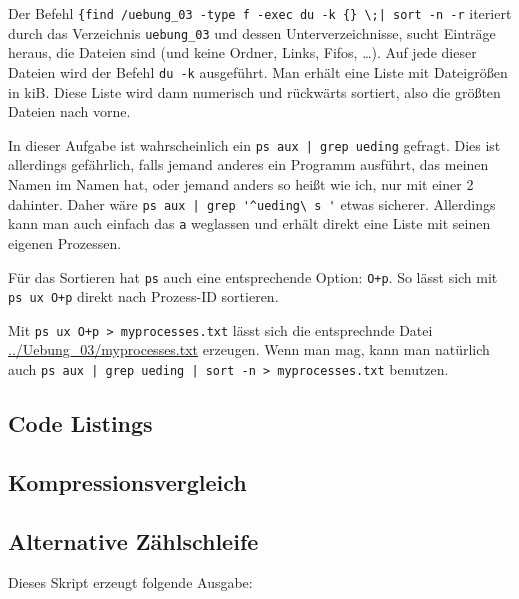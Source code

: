 \documentclass[10pt]{article}
\begin{document}
Der Befehl \verb#{find /uebung_03 -type f -exec du -k {} \;| sort -n -r# iteriert durch das Verzeichnis \verb#uebung_03# und dessen Unterverzeichnisse, sucht Einträge heraus, die Dateien sind (und keine Ordner, Links, Fifos, …). Auf jede dieser Dateien wird der Befehl \texttt{du -k} ausgeführt. Man erhält eine Liste mit Dateigrößen in kiB. Diese Liste wird dann numerisch und rückwärts sortiert, also die größten Dateien nach vorne.


In dieser Aufgabe ist wahrscheinlich ein \verb#ps aux | grep ueding# gefragt. Dies ist allerdings gefährlich, falls jemand anderes ein Programm ausführt, das meinen Namen im Namen hat, oder jemand anders so heißt wie ich, nur mit einer 2 dahinter. Daher wäre \verb#ps aux | grep '^ueding\ s '# etwas sicherer. Allerdings kann man auch einfach das \texttt{a} weglassen und erhält direkt eine Liste mit seinen eigenen Prozessen.

Für das Sortieren hat \texttt{ps} auch eine entsprechende Option: \texttt{O+p}. So lässt sich mit \texttt{ps ux O+p} direkt nach Prozess-ID sortieren.

Mit \verb#ps ux O+p > myprocesses.txt# lässt sich die entsprechnde Datei \url{../Uebung_03/myprocesses.txt} erzeugen. Wenn man mag, kann man natürlich auch \verb#ps aux | grep ueding | sort -n > myprocesses.txt# benutzen.





\newpage

\begin{appendix}



\section{Code Listings}
\subsection{Kompressionsvergleich}
\label{listing:compression}
\lstset{language=bash}


\subsection{Alternative Zählschleife}
\label{listing:zahlen2}

\lstset{language=bash}


Dieses Skript erzeugt folgende Ausgabe:


\end{appendix}
\end{document}
